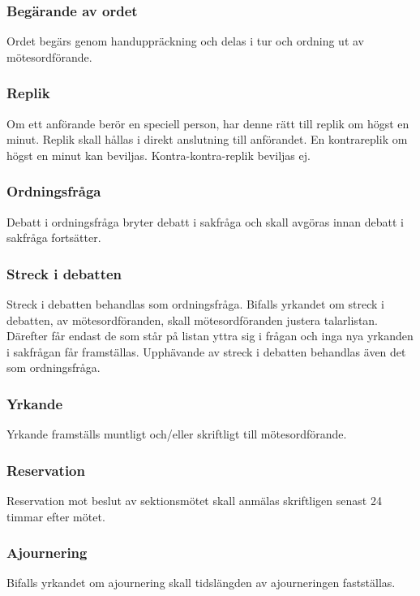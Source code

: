 \subsubsection{Begärande av ordet}
Ordet begärs genom handuppräckning och delas i tur och ordning ut av
mötesordförande.
  
\subsubsection{Replik}
Om ett anförande berör en speciell person, har denne rätt till replik om högst
en minut. Replik skall hållas i direkt anslutning till anförandet. En kontrareplik
om högst en minut kan beviljas. Kontra-kontra-replik beviljas ej.
 
\subsubsection{Ordningsfråga}
Debatt i ordningsfråga bryter debatt i sakfråga och skall avgöras innan debatt
i sakfråga fortsätter.

\subsubsection{Streck i debatten}
Streck i debatten behandlas som ordningsfråga. Bifalls yrkandet om streck i
debatten, av mötesordföranden, skall mötesordföranden justera talarlistan.
Därefter får endast de som står på listan yttra sig i frågan och inga nya
yrkanden i sakfrågan får framställas. Upphävande av streck i debatten
behandlas även det som ordningsfråga.
 
\subsubsection{Yrkande}
Yrkande framställs muntligt och/eller skriftligt till mötesordförande.

\subsubsection{Reservation}
Reservation mot beslut av sektionsmötet skall anmälas skriftligen senast 24
timmar efter mötet.
 
\subsubsection{Ajournering}
Bifalls yrkandet om ajournering skall tidslängden av ajourneringen fastställas.

